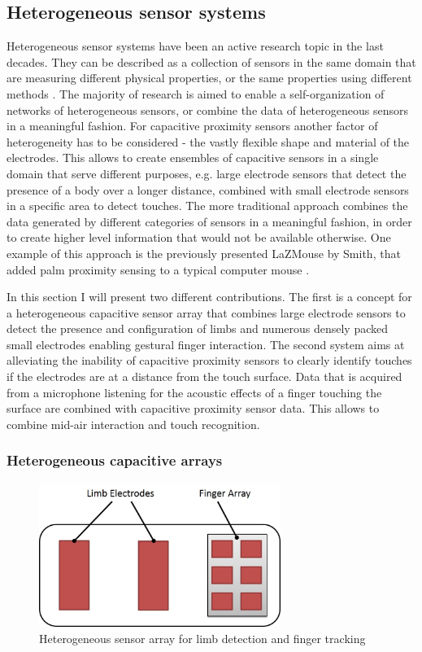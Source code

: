 \subsection{Heterogeneous sensor systems}
\label{ch:proc_hetero}
Heterogeneous sensor systems have been an active research topic in the last decades. They can be described as a collection of sensors in the same domain that are measuring different physical properties, or the same properties using different methods \cite{buczak1998self}. The majority of research is aimed to enable a self-organization of networks of heterogeneous sensors, or combine the data of heterogeneous sensors in a meaningful fashion. For capacitive proximity sensors another factor of heterogeneity has to be considered - the vastly flexible shape and material of the electrodes. This allows to create ensembles of capacitive sensors in a single domain that serve different purposes, e.g. large electrode sensors that detect the presence of a body over a longer distance, combined with small electrode sensors in a specific area to detect touches. The more traditional approach combines the data generated by different categories of sensors in a meaningful fashion, in order to create higher level information that would not be available otherwise. One example of this approach is the previously presented LaZMouse by Smith, that added palm proximity sensing to a typical computer mouse \cite{smith1999thesis}.

In this section I will present two different contributions. The first is a concept for a heterogeneous capacitive sensor array that combines large electrode sensors to detect the presence and configuration of limbs and numerous densely packed small electrodes enabling gestural finger interaction. The second system aims at alleviating the inability of capacitive proximity sensors to clearly identify touches if the electrodes are at a distance from the touch surface. Data that is acquired from a microphone listening for the acoustic effects of a finger touching the surface are combined with capacitive proximity sensor data. This allows to combine mid-air interaction and touch recognition.

\subsubsection{Heterogeneous capacitive arrays}
\begin{figure}[ht]
\centering
\includegraphics[width=0.7\textwidth]{images/proc_hetero_array}
\caption{Heterogeneous sensor array for limb detection and finger tracking}
\label{fig:proc_hetero_array}
\end{figure}

